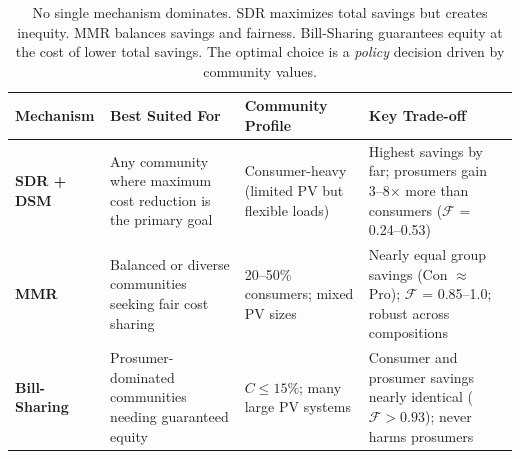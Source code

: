 \documentclass[11pt]{article}
\begin{document}
\begin{table}[h!]
\centering
\renewcommand{\arraystretch}{1.6}
\begin{tabular}{L{2.2cm} L{4.2cm} L{3.8cm} L{5cm}}
\toprule
\textbf{Mechanism} & \textbf{Best Suited For} & \textbf{Community Profile} & \textbf{Key Trade-off} \\
\midrule
{}\textbf{SDR + DSM} &
  Any community where maximum cost reduction is the primary goal &
  Consumer-heavy (limited PV but flexible loads) &
  Highest savings by far; prosumers gain 3--8$\times$ more than consumers ($\mathcal{F}$ = 0.24--0.53) \\[6pt]
\textbf{MMR} &
  Balanced or diverse communities seeking fair cost sharing &
  20--50\% consumers; mixed PV sizes &
  Nearly equal group savings (Con $\approx$ Pro); $\mathcal{F}$ = 0.85--1.0; robust across compositions \\[6pt]
\textbf{Bill-Sharing} &
  Prosumer-dominated communities needing guaranteed equity &
  $C \leq 15\%$; many large PV systems &
  Consumer and prosumer savings nearly identical ($\mathcal{F} > 0.93$); never harms prosumers \\
\bottomrule
\end{tabular}
\caption*{No single mechanism dominates. SDR maximizes total savings but creates inequity. MMR balances savings and fairness. Bill-Sharing guarantees equity at the cost of lower total savings. The optimal choice is a \emph{policy} decision driven by community values.}
\end{table}
\end{document}
